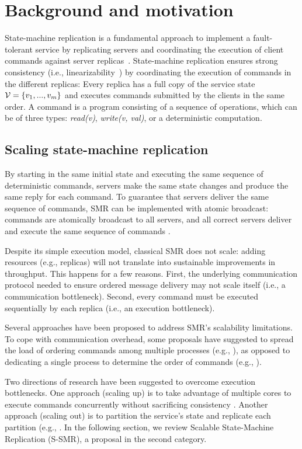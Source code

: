 \section{Background and motivation}
State-machine replication is a fundamental approach to implement a fault-tolerant service by replicating servers and coordinating the execution of client commands against server replicas~\cite{Lam78,Sch90}. 
State-machine replication ensures strong consistency (i.e., linearizability~\cite{Attiya04}) by coordinating the execution of commands in the different replicas: Every replica has a full copy of the service state $\mathcal{V} = \{v_1, ..., v_m\}$ and executes commands submitted by the clients in the same order. A command is a program consisting of a sequence of operations, which can be of three types: \emph{read(v)}, \emph{write(v, val)}, or a deterministic computation.

\subsection{Scaling state-machine replication}
By starting in the same initial state and executing the same sequence of deterministic commands, servers make the same state changes and produce the same reply for each command. To guarantee that servers deliver the same sequence of commands, SMR can be implemented with atomic broadcast: commands are atomically broadcast to all servers, and all correct servers deliver and execute the same sequence of commands \cite{BJ87b,DSU04}.

Despite its simple execution model, classical SMR does not scale: adding resources (e.g., replicas) will not translate into sustainable improvements in throughput. This happens for a few reasons. First, the underlying communication protocol needed to ensure ordered message delivery may not scale itself (i.e., a communication bottleneck). Second, every command must be executed sequentially by each replica (i.e., an execution bottleneck).

Several approaches have been proposed to address SMR’s scalability limitations. To cope with communication overhead, some proposals have suggested to spread the load of ordering commands among multiple processes (e.g., \cite{Moraru:2013gw,Mencius,Marandi:2012hb}), as opposed to dedicating a single process to determine the order of commands (e.g., \cite{CT96,Lamport:1998ea}).

Two directions of research have been suggested to overcome execution bottlenecks. One approach (scaling up) is to take advantage of multiple cores to execute commands concurrently without sacrificing consistency \cite{Kapritsos:2012um,Marandi:2014bj,Kotla:2004ep,Guo:2014jp}. Another approach (scaling out) is to partition the service's state and replicate each partition (e.g., \cite{Glendenning:2011kj,Marandi:2011dj}. In the following section, we review Scalable State-Machine Replication (S-SMR), a proposal in the second category.

